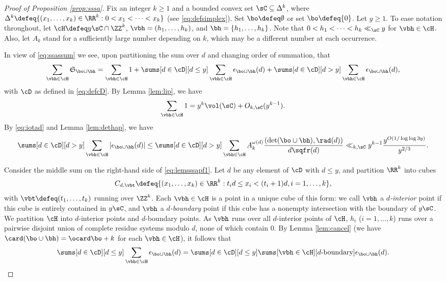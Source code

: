 \documentclass[12pt, reqno, twoside, letterpaper]{amsart}
\begin{document}
\begin{proof}[Proof of Proposition \ref{prop:sssa}]
%
Fix an integer $k \ge 1$ and a bounded convex set 
$\sC \subseteq \Delta^k$, where 
$
 \Delta^k \defeq \{(x_1,\ldots,x_k) \in \RR^k : 0 < x_1 < \cdots < x_k\}
$ 
(see \eqref{eq:defsimplex}). 
%
Set $\bo \defeq \emptyset$ or set $\bo \defeq \{0\}$.
%
Let $y \ge 1$.
%
To ease notation throughout, let $\cH \defeq y\sC \cap \ZZ^k$, 
$\vbh = (h_1,\ldots,h_k)$, and $\bh = \{h_1,\ldots,h_k\}$.
%
Note that $0 < h_1 < \cdots < h_k \ll_{\sC} y$ for $\vbh \in \cH$.
%
Also, let $A_k$ stand for a sufficiently large number depending on 
$k$, which may be a different number at each occurrence.

In view of \eqref{eq:ssassum} we see, upon partitioning the sum 
over $d$ and changing order of summation, that  
\begin{equation}
 \label{eq:lemsssapf1}
 \sum_{\vbh \in \cH} \mathfrak{S}_{\bo \cup \bh}
  =
   \sum_{\vbh \in \cH} 1
    +
      \sums[d \in \cD][d \le y]
       \sum_{\vbh \in \cH} \epsilon_{\bo \cup \bh}(d)
      +
       \sums[d \in \cD][d > y]
        \sum_{\vbh \in \cH} \epsilon_{\bo \cup \bh}(d),
\end{equation}
with $\cD$ as defined in \eqref{eq:defcD}.
%
By Lemma \ref{lem:lip}, we have 
\begin{equation}
 \label{eq:volH}
  \sum_{\vbh \in \cH} 1
   =
    y^k \vol(\sC) + O_{k,\sC}(y^{k - 1}).
\end{equation}
%
By \eqref{eq:iotad} and Lemma \ref{lem:dethap}, we have 
\begin{equation}
 \label{eq:sum3}
 \sums[d \in \cD][d > y]
  \sum_{\vbh \in \cH} |\epsilon_{\bo \cup \bh}(d)|
   \le 
    \sums[d \in \cD][d > y]
     \sum_{\vbh \in \cH} A_k^{\omega(d)}\frac{(\det(\bo \cup \bh),\rad(d))}{d\sqfr(d)}
      \ll_{k,\sC} 
       y^{k - 1}\frac{y^{O(1/\log\log 3y)}}{y^{2/3}}.
\end{equation}

Consider the middle sum on the right-hand side of 
\eqref{eq:lemsssapf1}.
%
Let $d$ be any element of $\cD$ with $d \le y$, and partition 
$\RR^k$ into cubes 
\[
 C_{d,\vbt} 
  \defeq 
   \{(x_1,\ldots,x_k) \in \RR^k : t_id \le x_i < (t_i + 1)d, i = 1,\ldots,k\},
\]
with $\vbt \defeq (t_1,\ldots,t_k)$ running over $\ZZ^k$.
%
Each $\vbh \in \cH$ is a point in a unique cube of this form: we 
call $\vbh$ a {\em $d$-interior} point if this cube is entirely 
contained in $y\sC$, and $\vbh$ a {\em $d$-boundary} point if this 
cube has a nonempty intersection with the boundary of $y\sC$.
%
We partition $\cH$ into $d$-interior points and $d$-boundary 
points.
%
As $\vbh$ runs over all $d$-interior points of $\cH$, $h_i$ 
($i = 1,\ldots,k$) runs over a pairwise disjoint union of complete 
residue systems modulo $d$, none of which contain $0$.
%
By Lemma \ref{lem:cancel} (we have 
$\card(\bo \cup \bh) = \ocard \bo + k$ for each $\vbh \in \cH$), 
it follows that 
\begin{equation}
 \label{eq:2ndlast}
  \sums[d \in \cD][d \le y] 
   \sum_{\vbh \in \cH}
    \epsilon_{\bo \cup \bh}(d)
  =
   \sums[d \in \cD][d \le y]
    \sums[\vbh \in \cH][\text{$d$-boundary}]
     \epsilon_{\bo \cup \bh}(d).
\end{equation}


\end{proof}
\end{document}
